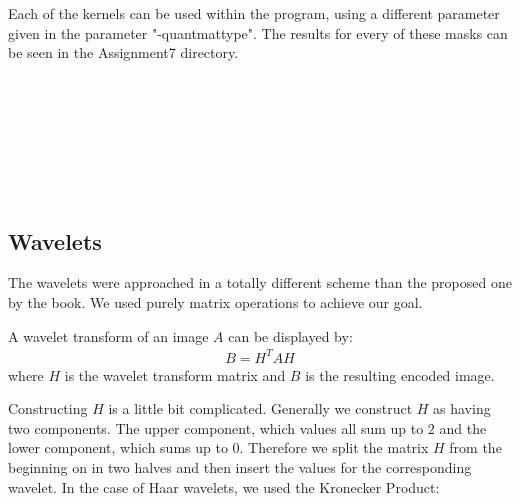 Each of the kernels can be used within the program, using a different parameter given in the parameter "-quantmattype". The results for every of these masks can be seen in the Assignment7 directory.

\begin{figure*}[h!]
    \centering
 ~
 
 
 ~
 
 ~
 
 ~
\end{figure*}




\subsection{Wavelets}

The wavelets were approached in a totally different scheme than the proposed one by the book. We used purely matrix operations to achieve our goal.

A wavelet transform of an image $A$ can be displayed by:
\begin{gather*}
B = H^T A H
\end{gather*}
where $H$ is the wavelet transform matrix and $B$ is the resulting encoded image.

Constructing $H$ is a little bit complicated. Generally we construct $H$ as having two components. The upper component, which values all sum up to $2$ and the lower component, which sums up to $0$. Therefore we split the matrix $H$ from the beginning on in two halves and then insert the values for the corresponding wavelet.
In the case of Haar wavelets, we used the Kronecker Product:

